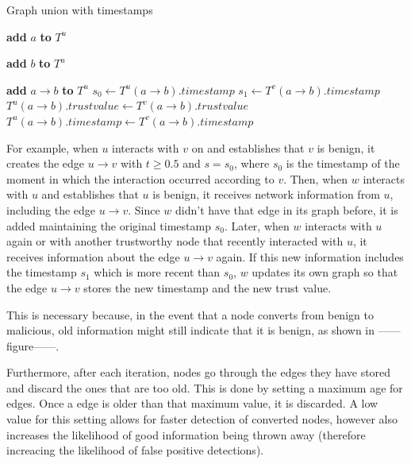 \begin{algorithm}
\caption{Graph union with timestamps}\label{algorithm:union_timestamp}
\begin{algorithmic}[1]



		\State \textbf{add} $a$ \textbf{to} $T^u$
	\EndIf
	
		\State \textbf{add} $b$ \textbf{to} $T^u$
	\EndIf
	
		\State \textbf{add} $a\rightarrow b$ \textbf{to} $T^u$
	\Else
		\State $s_0 \gets T^u(a\rightarrow b).timestamp$
		\State $s_1 \gets T^v(a\rightarrow b).timestamp$
			\State $T^u(a\rightarrow b).trustvalue \gets T^v(a\rightarrow b).trustvalue$
			\State $T^u(a\rightarrow b).timestamp \gets T^v(a\rightarrow b).timestamp$
		\EndIf	
	\EndIf
\EndFor

\EndFunction
\end{algorithmic}
\end{algorithm}

For example, when $u$ interacts with $v$ on and establishes that $v$ is benign, it creates the edge $u \rightarrow v$ with $t \geq 0.5$ and $s = s_0$, where $s_0$ is the timestamp of the moment in which the interaction occurred according to $v$.
Then, when $w$ interacts with $u$ and establishes that $u$ is benign, it receives network information from $u$, including the edge $u\rightarrow v$.
Since $w$ didn't have that edge in its graph before, it is added maintaining the original timestamp $s_0$.
Later, when $w$ interacts with $u$ again or with another trustworthy node that recently interacted with $u$, it receives information about the edge $u\rightarrow v$ again.
If this new information includes the timestamp $s_1$ which is more recent than $s_0$, $w$ updates its own graph so that the edge $u\rightarrow v$ stores the new timestamp and the new trust value.

This is necessary because, in the event that a node converts from benign to malicious, old information might still indicate that it is benign, as shown in ------figure------. 

Furthermore, after each iteration, nodes go through the edges they have stored and discard the ones that are too old.
This is done by setting a maximum age for edges.
Once a edge is older than that maximum value, it is discarded.
A low value for this setting allows for faster detection of converted nodes, however  also increases the likelihood of good information being thrown away (therefore increacing the likelihood of false positive detections).

